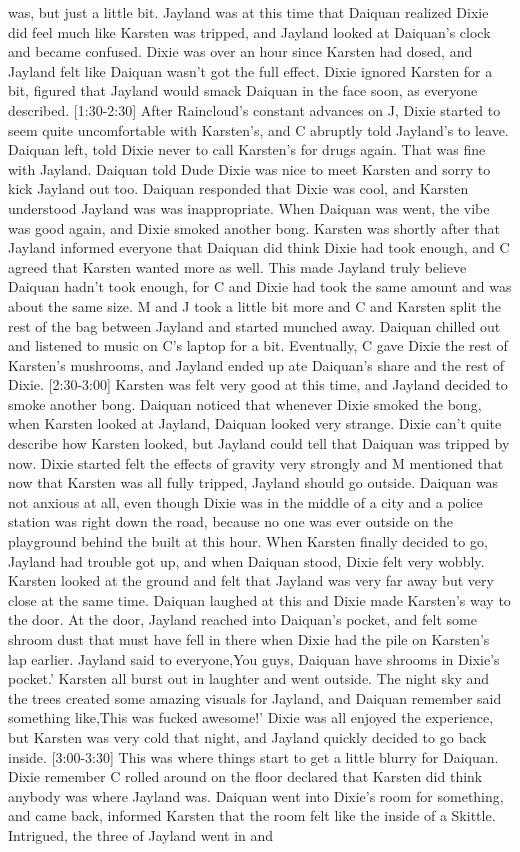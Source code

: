 \documentclass[12pt]{book}
\begin{document}
was, but just a little bit. Jayland was at this time that Daiquan realized Dixie did feel much like Karsten was tripped, and Jayland looked at Daiquan's clock and became confused. Dixie was over an hour since Karsten had dosed, and Jayland felt like Daiquan wasn't got the full effect. Dixie ignored Karsten for a bit, figured that Jayland would smack Daiquan in the face soon, as everyone described. [1:30-2:30] After Raincloud's constant advances on J, Dixie started to seem quite uncomfortable with Karsten's, and C abruptly told Jayland's to leave. Daiquan left, told Dixie never to call Karsten's for drugs again. That was fine with Jayland. Daiquan told Dude Dixie was nice to meet Karsten and sorry to kick Jayland out too. Daiquan responded that Dixie was cool, and Karsten understood Jayland was was inappropriate. When Daiquan was went, the vibe was good again, and Dixie smoked another bong. Karsten was shortly after that Jayland informed everyone that Daiquan did think Dixie had took enough, and C agreed that Karsten wanted more as well. This made Jayland truly believe Daiquan hadn't took enough, for C and Dixie had took the same amount and was about the same size. M and J took a little bit more and C and Karsten split the rest of the bag between Jayland and started munched away. Daiquan chilled out and listened to music on C's laptop for a bit. Eventually, C gave Dixie the rest of Karsten's mushrooms, and Jayland ended up ate Daiquan's share and the rest of Dixie. [2:30-3:00] Karsten was felt very good at this time, and Jayland decided to smoke another bong. Daiquan noticed that whenever Dixie smoked the bong, when Karsten looked at Jayland, Daiquan looked very strange. Dixie can't quite describe how Karsten looked, but Jayland could tell that Daiquan was tripped by now. Dixie started felt the effects of gravity very strongly and M mentioned that now that Karsten was all fully tripped, Jayland should go outside. Daiquan was not anxious at all, even though Dixie was in the middle of a city and a police station was right down the road, because no one was ever outside on the playground behind the built at this hour. When Karsten finally decided to go, Jayland had trouble got up, and when Daiquan stood, Dixie felt very wobbly. Karsten looked at the ground and felt that Jayland was very far away but very close at the same time. Daiquan laughed at this and Dixie made Karsten's way to the door. At the door, Jayland reached into Daiquan's pocket, and felt some shroom dust that must have fell in there when Dixie had the pile on Karsten's lap earlier. Jayland said to everyone,You guys, Daiquan have shrooms in Dixie's pocket.' Karsten all burst out in laughter and went outside. The night sky and the trees created some amazing visuals for Jayland, and Daiquan remember said something like,This was fucked awesome!' Dixie was all enjoyed the experience, but Karsten was very cold that night, and Jayland quickly decided to go back inside. [3:00-3:30] This was where things start to get a little blurry for Daiquan. Dixie remember C rolled around on the floor declared that Karsten did think anybody was where Jayland was. Daiquan went into Dixie's room for something, and came back, informed Karsten that the room felt like the inside of a Skittle. Intrigued, the three of Jayland went in and 
\end{document}
